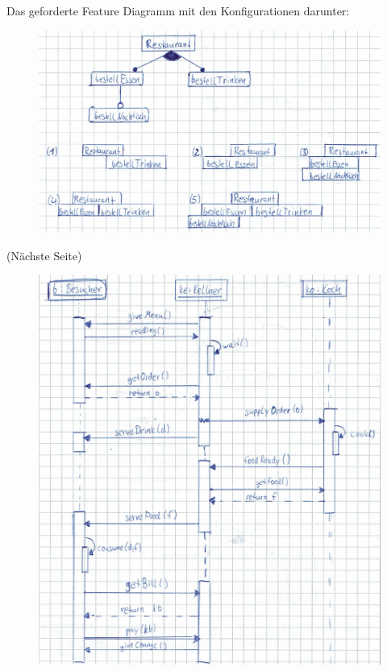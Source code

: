 Das geforderte Feature Diagramm mit den Konfigurationen darunter:
\begin{figure}[h]
  \centering
  \includegraphics{4_featdiag}
\end{figure}

(Nächste Seite)
\begin{figure}[h]
  \centering
  \includegraphics{4_seqdiag}
\end{figure}